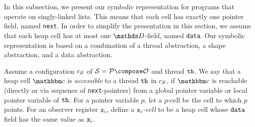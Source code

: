 
In this subsection, we present our symbolic representation for programs that
operate on singly-linked lists. This means that
each cell has exactly one pointer field, named {\tt next}.
In order to simplify the presentation in this section, we assume that
each heap cell has at most one $\ddomain$-field, named  {\tt data}.
Our symbolic representation is based on a combination of a thread abstraction, a
shape  abstraction, and a data abstraction.

Assume a configuration $c_{\mathcal S}$ of $\system=\prog\compose\observer$
and thread ${\tt th}$.
We say that a heap cell $\cell$ is {\em accessible} to a thread ${\tt th}$
in $c_{\mathcal S}$,
if $\cell$ is reachable (directly or via sequence of
{\tt next}-pointers) from a global pointer variable or local pointer
variable of ${\tt th}$.
For a pointer variable $p$, let a $p$-cell be the cell to which $p$ points.
For an observer register $\mathtt{x}_i$,  define a
{\em $\mathtt{x}_i$-cell} to be a heap cell whose
${\tt data}$ field has the same value as $\mathtt{x}_i$.
